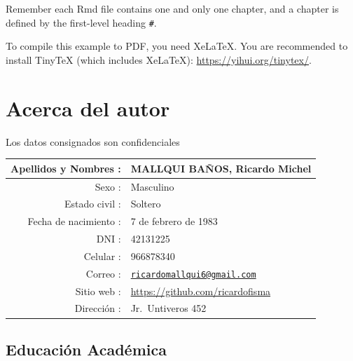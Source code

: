 \documentclass[]{krantz}
\begin{document}
Remember each Rmd file contains one and only one chapter, and a chapter is defined by the first-level heading \texttt{\#}.

To compile this example to PDF, you need XeLaTeX. You are recommended to install TinyTeX (which includes XeLaTeX): \url{https://yihui.org/tinytex/}.

\hypertarget{acerca-del-autor}{%
\chapter*{Acerca del autor}\label{acerca-del-autor}}

Los datos consignados son confidenciales

\begin{longtable}[]{@{}rl@{}}
\toprule
Apellidos y Nombres : & MALLQUI BAÑOS, Ricardo Michel\tabularnewline
\midrule
\endhead
Sexo : & Masculino\tabularnewline
Estado civil : & Soltero\tabularnewline
Fecha de nacimiento : & 7 de febrero de 1983\tabularnewline
DNI : & 42131225\tabularnewline
Celular : & 966878340\tabularnewline
Correo : & \href{mailto:ricardomallqui6@gmail.com}{\nolinkurl{ricardomallqui6@gmail.com}}\tabularnewline
Sitio web : & \url{https://github.com/ricardofisma}\tabularnewline
Dirección : & Jr.~Untiveros 452\tabularnewline
\bottomrule
\end{longtable}

\hypertarget{educaciuxf3n-acaduxe9mica}{%
\section*{Educación Académica}\label{educaciuxf3n-acaduxe9mica}}
\end{document}
